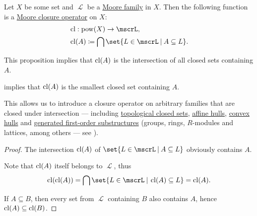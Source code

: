 \begin{proposition}\label{thm:closure_operator_from_set_semilattice}
  Let \( X \) be some set and \( \mscrL \) be a \hyperref[def:moore_family]{Moore family} in \( X \). Then the following function is a \hyperref[def:moore_closure_operator]{Moore closure operator} on \( X \):
  \begin{equation*}
    \begin{aligned}
      &\cl: \pow(X) \to \mscrL, \\
      &\cl(A) \coloneqq \bigcap \set{ L \in \mscrL \given A \subseteq L }. \\
    \end{aligned}
  \end{equation*}
\end{proposition}
\begin{comments}
  \item This proposition implies that \( \operatorname{cl}(A) \) is the intersection of all closed sets containing \( A \).
  \item {} implies that \( \operatorname{cl}(A) \) is the smallest closed set containing \( A \).
  \item This allows us to introduce a closure operator on arbitrary families that are closed under intersection --- including \hyperref[def:topological_space]{topological closed sets}, \hyperref[def:affine_hull]{affine hulls}, \hyperref[def:convex_hull]{convex hulls} and \hyperref[def:first_order_generated_substructure]{generated first-order substructures} (groups, rings, \( R \)-modules and lattices, among others --- see ).
\end{comments}
\begin{proof}
   The intersection \( \operatorname{cl}(A) \) of \( \set{ L \in \mscrL \given A \subseteq L } \) obviously contains \( A \).

   Note that \( \operatorname{cl}(A) \) itself belongs to \( \mscrL \), thus
  \begin{equation*}
    \cl(\cl(A)) = \bigcap \set{ L \in \mscrL \given \cl(A) \subseteq L } = \cl(A).
  \end{equation*}

   If \( A \subseteq B \), then every set from \( \mscrL \) containing \( B \) also contains \( A \), hence \( \operatorname{cl}(A) \subseteq \operatorname{cl}(B) \).
\end{proof}
